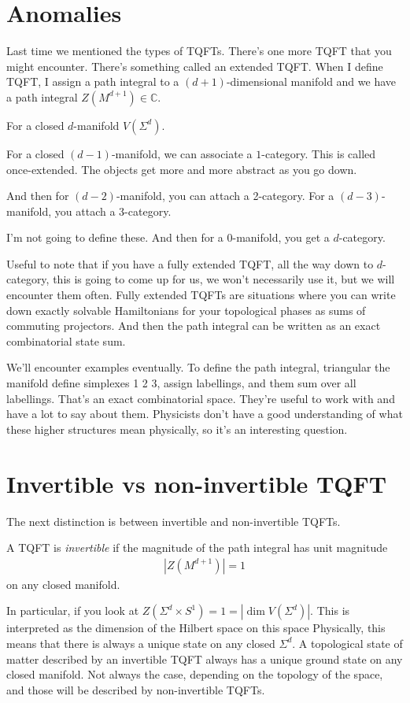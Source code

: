 \section{Anomalies}
Last time we mentioned the types of TQFTs.
There's one more TQFT that you might encounter.
There's something called an extended TQFT.\@
When I define TQFT,
I assign a path integral to a $(d+1)$-dimensional manifold
and we have a path integral
$Z\left( M^{d+1} \right)\in \mathbb{C}$.

For a closed $d$-manifold $V(\Sigma^d)$.

For a closed $(d-1)$-manifold,
we can associate a $1$-category.
This is called once-extended.
The objects get more and more abstract as you go down.

And then for $(d - 2)$-manifold,
you can attach a 2-category.
For a $(d-3)$-manifold,
you attach a 3-category.

I'm not going to define these.
And then for a 0-manifold,
you get a $d$-category.

Useful to note that if you have a fully extended TQFT,
all the way down to $d$-category,
this is going to come up for us,
we won't necessarily use it,
but we will encounter them often.
Fully extended TQFTs are situations where you can write down exactly solvable
Hamiltonians for your topological phases as sums of commuting projectors.
And then the path integral can be written as an exact combinatorial state sum.

We'll encounter examples eventually.
To define the path integral,
triangular the manifold
define simplexes 1 2 3,
assign labellings,
and them sum over all labellings.
That's an exact combinatorial space.
They're useful to work with and have a lot to say about them.
Physicists don't have a good understanding of what these higher structures mean
physically,
so it's an interesting question.


\section{Invertible vs non-invertible TQFT}
The next distinction is between invertible and non-invertible TQFTs.

\begin{definition}
    A TQFT is \emph{invertible} if the magnitude of the path integral has unit
    magnitude
    \begin{align}
        |Z(M^{d+1})| = 1
    \end{align}
    on any closed manifold.
\end{definition}
In particular, if you look at $Z(\Sigma^d\times S^1) = 1
= |\dim V(\Sigma^d)|$.
This is interpreted as the dimension of the Hilbert space on this space
Physically,
this means that there is always a unique state on any closed $\Sigma^d$.
A topological state of matter described by an invertible TQFT always has a
unique ground state on any closed manifold.
Not always the case,
depending on the topology of the space,
and those will be described by non-invertible TQFTs.

